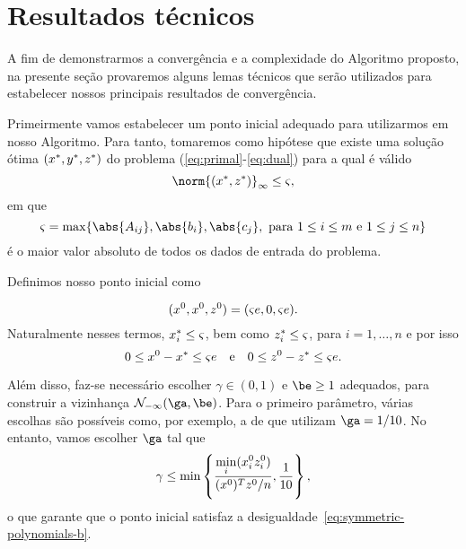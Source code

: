

\section{Resultados técnicos}



A fim de demonstrarmos a convergência e a complexidade do Algoritmo proposto, na presente seção provaremos alguns lemas técnicos que serão utilizados para estabelecer nossos principais resultados de convergência.



Primeirmente vamos  estabelecer um ponto inicial adequado para utilizarmos em nosso Algoritmo. Para tanto, tomaremos como hipótese que existe uma solução ótima $(x^*,y^*,z^*)$  do problema (\ref{eq:primal}-\ref{eq:dual}) para a qual é válido  
\begin{equation}
	\label{eq:norm-xz-star}
	\norm{(\xstar,\zstar)}_{\infty} \leq \bdxzstar,
\end{equation}
em que 
 \[
 	\bdxzstar = \max\{\abs{A_{ij}},\abs{b_{i}},\abs{c_{j}}, \text{ para } 1\leq i\leq m \text{ e } 1\leq j \leq n  \}
 \]
é o maior valor absoluto de todos os dados de entrada do problema. 

Definimos nosso ponto inicial como

\begin{equation}
	\label{eq:initial-point}
	(x^0 ,x^0,z^0 ) = (\varsigma e, 0, \varsigma e ).
\end{equation}
Naturalmente nesses termos, $x^*_{i}\leq   \varsigma$, bem como $z^*_{i}\leq \varsigma $, para $i=1,\ldots,n$ e por isso
\begin{equation}
	\label{eq:x0}
0\leq x^{0} - x^* \leq \varsigma e \quad \text{e} \quad 0\leq z^0  - z^* \leq \varsigma e. 
\end{equation}


Além disso, faz-se necessário  escolher  $\gamma\in(0,1)$  e $\be\geq 1$ adequados, para construir a vizinhança $\Nset_{-\infty}(\ga,\be)$. Para o primeiro parâmetro, várias escolhas são possíveis como, por exemplo, a de 
\textcite{Colombo:2008ia} que utilizam $\ga = 1/10$. No entanto, vamos escolher $\ga$ tal que  
\[
\gamma \leq  \min\left\{ \frac{\displaystyle \min_{i}(x^0_{i} z^0_{i} )}{(x^0 )^Tz^0 /n}, \frac{1}{10}\right\},
\]
o que garante que o ponto inicial satisfaz a desigualdade~\eqref{eq:symmetric-polynomials-b}.

